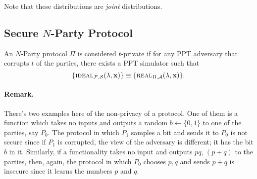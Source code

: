 Note that these distributions are \textit{joint} distributions.

\subsection{Secure $N$-Party Protocol}

\begin{definition}
	An \rarrow $N$-Party protocol $\Pi$ is considered $t$-private if for any PPT adversary that corrupts $t$ of the parties, there exists a PPT simulator such that
	$$\{\textsc{ideal}_{\mathcal{F},\mathcal{S}}(\lambda,\mathbf{x})\}\equiv\{\textsc{real}_{\Pi,\mathcal{A}}(\lambda,\mathbf{x})\}.$$
\end{definition}

\paragraph{Remark.} There's two examples here of the non-privacy of a protocol. One of them is a function which takes no inputs and outputs a random $b\leftarrow\{0,1\}$ to one of the parties, say $P_0$. The protocol in which $P_1$ samples a bit and sends it to $P_0$ is not secure since if $P_1$ is corrupted, the view of the adversary is different; it has the bit $b$ in it. Similarly, if a functionality takes no input and outputs $pq$, $(p+q)$ to the parties, then, again, the protocol in which $P_0$ chooses $p,q$ and sends $p+q$ is insecure since it learns the numbers $p$ and $q$.